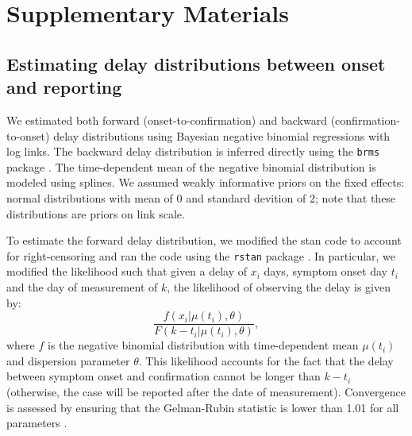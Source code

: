 \documentclass[12pt]{article}
\begin{document}
\pagebreak



\pagebreak

\renewcommand\thefigure{S\arabic{figure}}
\setcounter{figure}{0}    

\section*{Supplementary Materials}

\subsection*{Estimating delay distributions between onset and reporting}

We estimated both forward (onset-to-confirmation) and backward (confirmation-to-onset) delay distributions using Bayesian negative binomial regressions with log links.
The backward delay distribution is inferred directly using the \texttt{brms} package \citep{burkner2017brms}.
The time-dependent mean of the negative binomial distribution is modeled using splines.
We assumed weakly informative priors on the fixed effects: normal distributions with mean of 0 and standard devition of 2;
note that these distributions are priors on link scale.

To estimate the forward delay distribution, we modified the stan code to account for right-censoring and ran the code using the \texttt{rstan} package \citep{rstan}.
In particular, we modified the likelihood such that given a delay of $x_i$ days, symptom onset day $t_i$ and the day of measurement of $k$, the likelihood of observing the delay is given by:
\begin{equation}
\frac{f(x_i|\mu(t_i), \theta)}{F(k-t_i|\mu(t_i), \theta)},
\end{equation}
where $f$ is the negative binomial distribution with time-dependent mean $\mu(t_i)$ and dispersion parameter $\theta$. This likelihood accounts for the fact that the delay between symptom onset and confirmation cannot be longer than $k-t_i$ (otherwise, the case will be reported after the date of measurement). Convergence is assessed by ensuring that the Gelman-Rubin statistic is lower than 1.01 for all parameters \citep{gelman1992inference}.

\pagebreak
\end{document}
